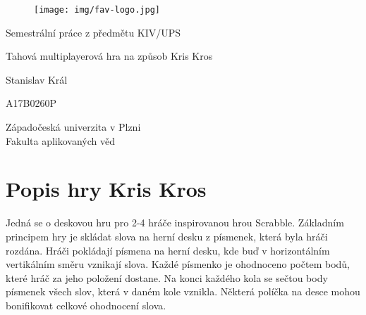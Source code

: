 \documentclass[12pt, a4paper]{article}
\let\oldsection\section
\renewcommand\section{\clearpage\oldsection}
\begin{document}
	\renewcommand{\lstlistingname}{Ukázka kódu}
	\renewcommand{\lstlistlistingname}{Seznam ukázek kódu}
    \begin{titlepage}

       \centering

       \vspace*{\baselineskip}

       \begin{figure}[H]
          \centering
          \texttt{[image: img/fav-logo.jpg]}
       \end{figure}

       \vspace*{1\baselineskip}
       {\sc Semestrální práce z předmětu KIV/UPS}
       \vspace*{1\baselineskip}

       \vspace{0.75\baselineskip}

       {\LARGE\sc Tahová multiplayerová hra na způsob Kris Kros\\}

       \vspace{4\baselineskip}
       
		\vspace{0.5\baselineskip}

       
       {\sc\Large Stanislav Král \\}

       \vspace{0.5\baselineskip}

       {A17B0260P}

       \vfill

       {\sc Západočeská univerzita v Plzni\\
       Fakulta aplikovaných věd}


    \end{titlepage}


    \tableofcontents
    \pagebreak


    \section{Popis hry Kris Kros}
    Jedná se o deskovou hru pro 2-4 hráče inspirovanou hrou Scrabble. Základním principem hry je skládat slova na herní desku z písmenek, která byla hráči rozdána. Hráči pokládají písmena na herní desku, kde buď v horizontálním vertikálním směru vznikají slova. Každé písmenko je ohodnoceno počtem bodů, které hráč za jeho položení dostane. Na konci každého kola se sečtou body písmenek všech slov, která v daném kole vznikla. Některá políčka na desce mohou bonifikovat celkové ohodnocení slova.
\end{document}
